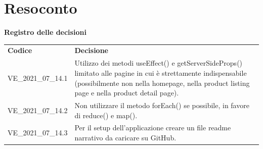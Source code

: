 \documentclass[a4paper]{article}
\begin{document}
\section{Resoconto}
\begin{center}
    \textbf{\Large Registro delle decisioni}\\
    \vspace{10px}
    \begin{table}[h!]
        \centering
        \renewcommand{\arraystretch}{1.8}
        \begin{tabular}{p{200px} p{200px}}
            \rowcolor{logo!70} \textbf{Codice} & \textbf{Decisione}                                                                                                                                                                                           \\
            VE\_2021\_07\_14.1                 & Utilizzo dei metodi useEffect() e getServerSideProps() limitato alle pagine in cui è strettamente indispensabile (possibilmente non nella homepage, nella product listing page e nella product detail page). \\
            VE\_2021\_07\_14.2                 & Non utilizzare il metodo forEach() se possibile, in favore di reduce() e map().                                                                                                                              \\
            VE\_2021\_07\_14.3                 & Per il setup dell'applicazione creare un file readme narrativo da caricare su GitHub.                                                                                                      \\
        \end{tabular}
    \end{table}
\end{center}
\end{document}
